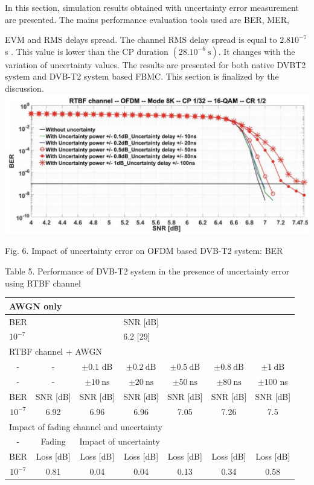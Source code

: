 \documentclass[10pt]{article}
\begin{document}
In this section, simulation results obtained with uncertainty error measurement are presented. The mains performance evaluation tools used are BER, MER,

EVM and RMS delays spread. The channel RMS delay spread is equal to $2.810^{-7}$ s . This value is lower than the CP duration $\left(28.10^{-6} \mathrm{~s}\right)$. It changes with the variation of uncertainty values. The results are presented for both native DVBT2 system and DVB-T2 system based FBMC. This section is finalized by the discussion.\\
\includegraphics[max width=\textwidth, center]{2024_11_15_3776bfa3c020725d7730g-2}

Fig. 6. Impact of uncertainty error on OFDM based DVB-T2 system: BER

Table 5. Performance of DVB-T2 system in the presence of uncertainty error using RTBF channel

\begin{center}
\begin{tabular}{|c|c|c|c|c|c|c|}
\hline
\multicolumn{7}{|l|}{AWGN only} \\
\hline
\multicolumn{3}{|l|}{BER} & \multicolumn{4}{|l|}{SNR [dB]} \\
\hline
\multicolumn{3}{|l|}{$10^{-7}$} & \multicolumn{4}{|l|}{6.2 [29]} \\
\hline
\multicolumn{7}{|l|}{RTBF channel + AWGN} \\
\hline
- & - & $\pm 0.1$ dB & $\pm 0.2 \mathrm{~dB}$ & $\pm 0.5 \mathrm{~dB}$ & $\pm 0.8 \mathrm{~dB}$ & $\pm 1 \mathrm{~dB}$ \\
\hline
- & - & $\pm 10 \mathrm{~ns}$ & $\pm 20 \mathrm{~ns}$ & $\pm 50 \mathrm{~ns}$ & $\pm 80 \mathrm{~ns}$ & $\pm 100$ ns \\
\hline
BER & SNR [dB] & SNR [dB] & SNR [dB] & SNR [dB] & SNR [dB] & SNR [dB] \\
\hline
$10^{-7}$ & 6.92 & 6.96 & 6.96 & 7.05 & 7.26 & 7.5 \\
\hline
\multicolumn{7}{|l|}{Impact of fading channel and uncertainty} \\
\hline
- & Fading & \multicolumn{5}{|l|}{Impact of uncertainty} \\
\hline
BER & Loss [dB] & Loss [dB] & Loss [dB] & Loss [dB] & Loss [dB] & Loss [dB] \\
\hline
$10^{-7}$ & 0.81 & 0.04 & 0.04 & 0.13 & 0.34 & 0.58 \\
\hline
\end{tabular}
\end{center}
\end{document}
